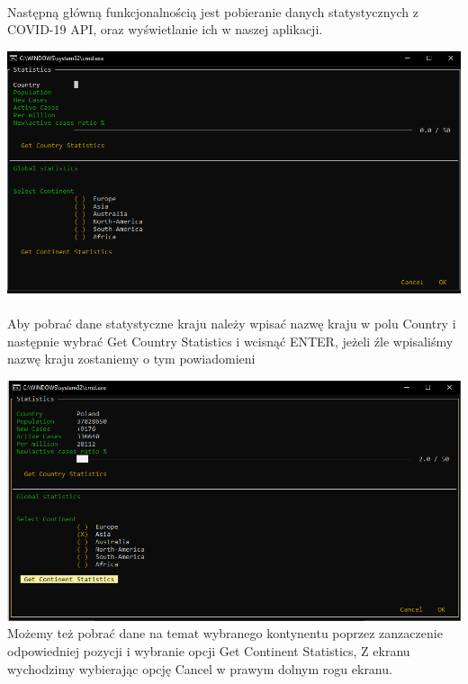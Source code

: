 \documentclass{article}
\begin{document}
\paragraph{}
Następną główną funkcjonalnością jest pobieranie danych statystycznych z COVID-19 API, oraz wyświetlanie ich w naszej aplikacji.

\includegraphics[width=\textwidth]{images/Statistics.png}\\

\paragraph{}
Aby pobrać dane statystyczne kraju należy wpisać nazwę kraju w polu Country i następnie wybrać Get Country Statistics i wcisnąć ENTER,
jeżeli źle wpisaliśmy nazwę kraju zostaniemy o tym powiadomieni

\includegraphics[width=\textwidth]{images/statistics_filled.png}\\

Możemy też pobrać dane na temat wybranego kontynentu poprzez zanzaczenie odpowiedniej pozycji i wybranie opcji Get Continent Statistics,
Z ekranu wychodzimy wybierając opcję Cancel w prawym dolnym rogu ekranu.
\end{document}
